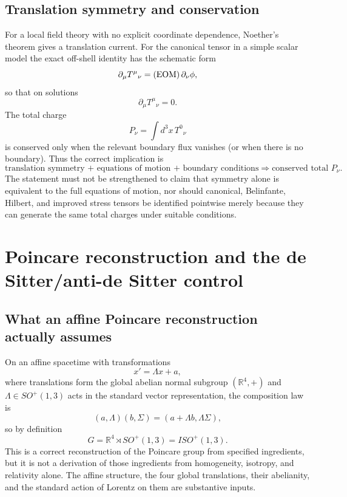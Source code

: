 \documentclass[11pt,a4paper]{article}
\begin{document}
\subsection{Translation symmetry and conservation}
For a local field theory with no explicit coordinate dependence, Noether's theorem gives a translation current.  For the canonical tensor in a simple scalar model the exact off-shell identity has the schematic form
\begin{equation}
\partial_\mu T^\mu{}_{\nu}
=({\rm EOM})\,\partial_\nu\phi,
\end{equation}
so that on solutions
\begin{equation}
\partial_\mu T^\mu{}_{\nu}=0.
\end{equation}
The total charge
\begin{equation}
P_\nu=\int d^3x\,T^0{}_{\nu}
\end{equation}
is conserved only when the relevant boundary flux vanishes (or when there is no boundary).  Thus the correct implication is
\begin{equation}
\boxed{\text{translation symmetry + equations of motion + boundary conditions}
\Longrightarrow \text{conserved total }P_\nu .}
\end{equation}
The statement must not be strengthened to claim that symmetry alone is equivalent to the full equations of motion, nor should canonical, Belinfante, Hilbert, and improved stress tensors be identified pointwise merely because they can generate the same total charges under suitable conditions.

\section{Poincare reconstruction and the de Sitter/anti-de Sitter control}
\subsection{What an affine Poincare reconstruction actually assumes}
On an affine spacetime with transformations
\begin{equation}
x' = \Lambda x+a,
\end{equation}
where translations form the global abelian normal subgroup $(\mathbb R^4,+)$ and $\Lambda\in SO^+(1,3)$ acts in the standard vector representation, the composition law is
\begin{equation}
(a,\Lambda)(b,\Sigma)=(a+\Lambda b,\Lambda\Sigma),
\end{equation}
so by definition
\begin{equation}
\boxed{G=\mathbb R^4\rtimes SO^+(1,3)=ISO^+(1,3).}
\end{equation}
This is a correct reconstruction of the Poincare group from specified ingredients, but it is not a derivation of those ingredients from homogeneity, isotropy, and relativity alone.  The affine structure, the four global translations, their abelianity, and the standard action of Lorentz on them are substantive inputs.
\end{document}
